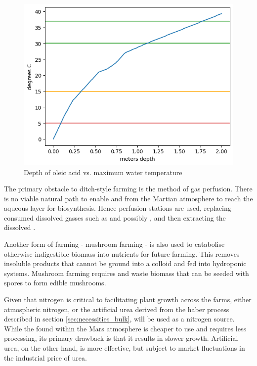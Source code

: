 \documentclass[fleqn,10pt]{Stylesheet} %
\begin{document}
\begin{figure}
    \centering
    \includegraphics[width=\linewidth]{figures/fig_bp.png}
    \caption{Depth of oleic acid vs. maximum water temperature}
    \label{fig:oleic_acid_bp}
\end{figure}

The primary obstacle to ditch-style farming is the method of gas perfusion. There is no viable natural path to enable  and  from the Martian atmosphere to reach the aqueous layer for biosynthesis. Hence perfusion stations are used, replacing consumed dissolved gasses such as  and possibly , and then extracting the dissolved . 

Another form of farming - mushroom farming - is also used to catabolise otherwise indigestible biomass into nutrients for future farming. This removes insoluble products that cannot be ground into a colloid and fed into hydroponic systems. Mushroom farming requires  and waste biomass that can be seeded with spores to form edible mushrooms.

Given that nitrogen is critical to facilitating plant growth across the farms, either atmospheric nitrogen, or the artificial urea derived from the haber process described in section \ref{sec:necessities_bulk}, will be used as a nitrogen source. While the  found within the Mars atmosphere is cheaper to use and requires less processing, its primary drawback is that it results in slower growth. Artificial urea, on the other hand, is more effective, but subject to market fluctuations in the industrial price of urea.
\end{document}
